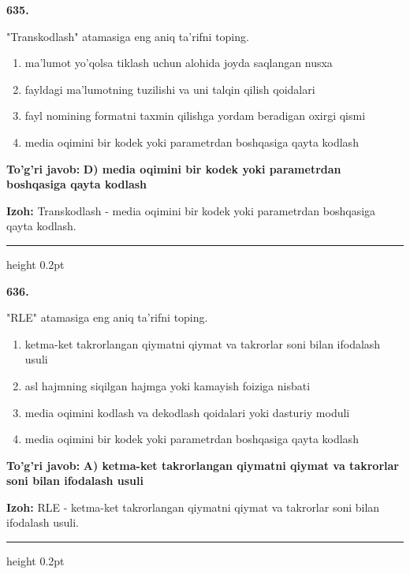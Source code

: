 \documentclass[10pt,a4paper,oneside]{article}
\begin{document}
\noindent\textbf{\color{ink}635.}
\par
"Transkodlash" atamasiga eng aniq ta'rifni toping.
\begin{enumerate}[label=\Alph*),leftmargin=9mm]
\item ma'lumot yo'qolsa tiklash uchun alohida joyda saqlangan nusxa
\item fayldagi ma'lumotning tuzilishi va uni talqin qilish qoidalari
\item fayl nomining formatni taxmin qilishga yordam beradigan oxirgi qismi
\item media oqimini bir kodek yoki parametrdan boshqasiga qayta kodlash
\end{enumerate}
\begin{tcolorbox}[enhanced,breakable,colback=teal!4,colframe=teal!50!black,boxrule=0.5pt,arc=1.1mm,left=3mm,right=3mm,top=1.7mm,bottom=1.7mm,before skip=2mm,after skip=2mm]
\textbf{\color{teal}To'g'ri javob:} \textbf{D) media oqimini bir kodek yoki parametrdan boshqasiga qayta kodlash}
\par\smallskip
\textbf{Izoh:} Transkodlash - media oqimini bir kodek yoki parametrdan boshqasiga qayta kodlash.
\end{tcolorbox}
\vspace{2mm}\hrule height 0.2pt \vspace{3mm}

\noindent\textbf{\color{ink}636.}
\par
"RLE" atamasiga eng aniq ta'rifni toping.
\begin{enumerate}[label=\Alph*),leftmargin=9mm]
\item ketma-ket takrorlangan qiymatni qiymat va takrorlar soni bilan ifodalash usuli
\item asl hajmning siqilgan hajmga yoki kamayish foiziga nisbati
\item media oqimini kodlash va dekodlash qoidalari yoki dasturiy moduli
\item media oqimini bir kodek yoki parametrdan boshqasiga qayta kodlash
\end{enumerate}
\begin{tcolorbox}[enhanced,breakable,colback=teal!4,colframe=teal!50!black,boxrule=0.5pt,arc=1.1mm,left=3mm,right=3mm,top=1.7mm,bottom=1.7mm,before skip=2mm,after skip=2mm]
\textbf{\color{teal}To'g'ri javob:} \textbf{A) ketma-ket takrorlangan qiymatni qiymat va takrorlar soni bilan ifodalash usuli}
\par\smallskip
\textbf{Izoh:} RLE - ketma-ket takrorlangan qiymatni qiymat va takrorlar soni bilan ifodalash usuli.
\end{tcolorbox}
\vspace{2mm}\hrule height 0.2pt \vspace{3mm}
\end{document}
